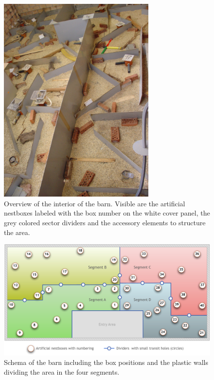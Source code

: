 \begin{figure}[htpb]
\begin{center}
  \includegraphics[width=0.7\textwidth]{assets/pdf/shed_overview.pdf}
  \caption[Interior of the barn]{Overview of the interior of the barn. Visible are the artificial nestboxes labeled with the box number on the white cover panel, the grey colored sector dividers and the accessory elements to structure the area.}
  \label{fig:shedoverview}
\end{center}
\end{figure}

\begin{figure}
  \includegraphics[width=\textwidth]{assets/pdf/shed_schema.pdf}
  \caption[Schema of the barn]{Schema of the barn including the box positions and the plastic walls dividing the area in the four segments. }
  \label{fig:barn_schema}
\end{figure}